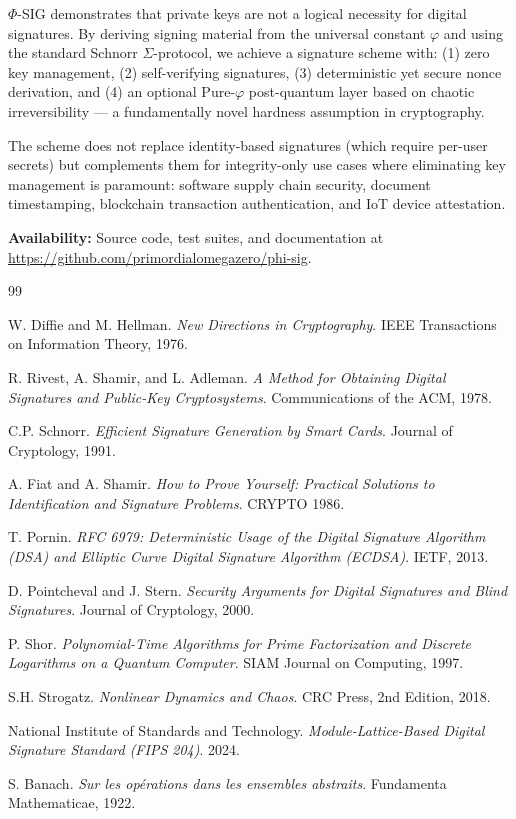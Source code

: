\documentclass{article}
\begin{document}
$\Phi$-SIG demonstrates that private keys are not a logical necessity for digital signatures. By deriving signing material from the universal constant $\varphi$ and using the standard Schnorr $\Sigma$-protocol, we achieve a signature scheme with: (1) zero key management, (2) self-verifying signatures, (3) deterministic yet secure nonce derivation, and (4) an optional Pure-$\varphi$ post-quantum layer based on chaotic irreversibility — a fundamentally novel hardness assumption in cryptography.

The scheme does not replace identity-based signatures (which require per-user secrets) but complements them for integrity-only use cases where eliminating key management is paramount: software supply chain security, document timestamping, blockchain transaction authentication, and IoT device attestation.

\textbf{Availability:} Source code, test suites, and documentation at \url{https://github.com/primordialomegazero/phi-sig}.

\begin{thebibliography}{99}

W. Diffie and M. Hellman.
\textit{New Directions in Cryptography}.
IEEE Transactions on Information Theory, 1976.

R. Rivest, A. Shamir, and L. Adleman.
\textit{A Method for Obtaining Digital Signatures and Public-Key Cryptosystems}.
Communications of the ACM, 1978.

C.P. Schnorr.
\textit{Efficient Signature Generation by Smart Cards}.
Journal of Cryptology, 1991.

A. Fiat and A. Shamir.
\textit{How to Prove Yourself: Practical Solutions to Identification and Signature Problems}.
CRYPTO 1986.

T. Pornin.
\textit{RFC 6979: Deterministic Usage of the Digital Signature Algorithm (DSA) and Elliptic Curve Digital Signature Algorithm (ECDSA)}.
IETF, 2013.

D. Pointcheval and J. Stern.
\textit{Security Arguments for Digital Signatures and Blind Signatures}.
Journal of Cryptology, 2000.

P. Shor.
\textit{Polynomial-Time Algorithms for Prime Factorization and Discrete Logarithms on a Quantum Computer}.
SIAM Journal on Computing, 1997.

S.H. Strogatz.
\textit{Nonlinear Dynamics and Chaos}.
CRC Press, 2nd Edition, 2018.

National Institute of Standards and Technology.
\textit{Module-Lattice-Based Digital Signature Standard (FIPS 204)}.
2024.

S. Banach.
\textit{Sur les op\'erations dans les ensembles abstraits}.
Fundamenta Mathematicae, 1922.

\end{thebibliography}
\end{document}
